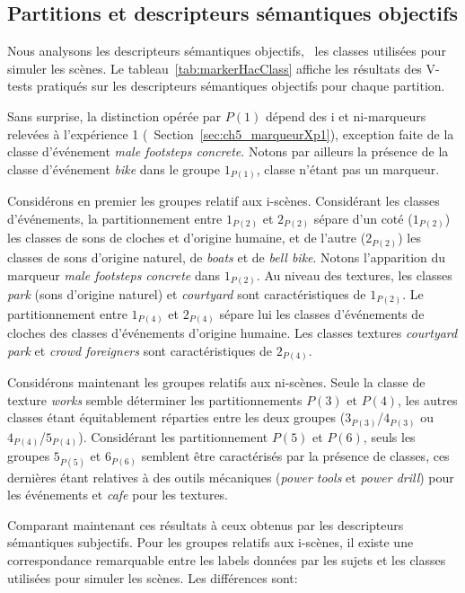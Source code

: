 \subsection{Partitions et descripteurs sémantiques objectifs}

Nous analysons les descripteurs sémantiques objectifs, \ie~les classes utilisées pour simuler les scènes. Le tableau~\ref{tab:markerHacClass} affiche les résultats des V-tests pratiqués sur les descripteurs sémantiques objectifs pour chaque partition.

Sans surprise, la distinction opérée par $P(1)$ dépend des i et ni-marqueurs relevées à l'expérience 1 (\cf~Section~\ref{sec:ch5_marqueurXp1}), exception faite de la classe d'événement \emph{male footsteps concrete}. Notons par ailleurs la présence de la classe d'événement \emph{bike} dans le groupe $1_{P(1)}$, classe n'étant pas un marqueur.

Considérons en premier les groupes relatif aux i-scènes. Considérant les classes d'événements, la partitionnement entre $1_{P(2)}$ et $2_{P(2)}$ sépare d'un coté  ($1_{P(2)}$) les classes de sons de cloches et d'origine humaine, et de l'autre ($2_{P(2)}$) les classes de sons d'origine naturel, de \emph{boats} et de \emph{bell bike}. Notons l'apparition du marqueur \emph{male footsteps concrete} dans $1_{P(2)}$. Au niveau des textures, les classes \emph{park} (sons d'origine naturel)  et \emph{courtyard}  sont caractéristiques de $1_{P(2)}$. Le partitionnement entre  $1_{P(4)}$ et $2_{P(4)}$ sépare lui les classes d'événements de cloches des classes d'événements d'origine humaine.  Les classes textures \emph{courtyard park} et \emph{crowd foreigners} sont caractéristiques de $2_{P(4)}$.

Considérons maintenant les groupes relatifs aux ni-scènes. Seule la classe de texture \emph{works} semble déterminer les partitionnements $P(3)$ et $P(4)$, les autres classes étant équitablement réparties entre les deux groupes ($3_{P(3)}$/$4_{P(3)}$ ou $4_{P(4)}$/$5_{P(4)}$). Considérant les partitionnement  $P(5)$ et $P(6)$, seuls les groupes $5_{P(5)}$ et $6_{P(6)}$ semblent être caractérisés par la présence de classes, ces dernières étant relatives à des outils mécaniques (\emph{power tools} et \emph{power drill}) pour les événements et \emph{cafe} pour les textures.


Comparant maintenant ces résultats à ceux obtenus par les descripteurs sémantiques subjectifs. Pour les groupes relatifs aux i-scènes, il existe une correspondance remarquable entre les labels données par les sujets et les classes utilisées pour simuler les scènes. Les différences sont:

